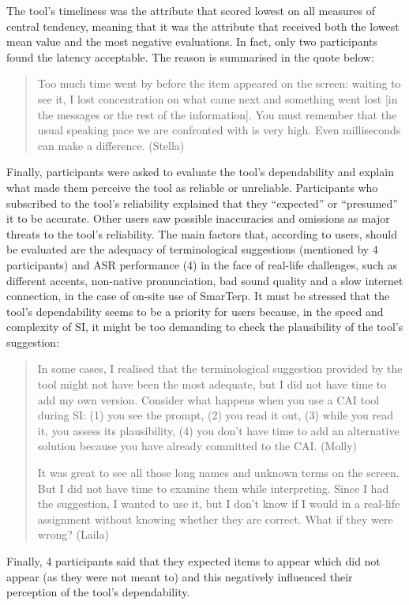 The tool’s timeliness was the attribute that scored lowest on all measures of central tendency, meaning that it was the attribute that received both the lowest mean value and the most negative evaluations. In fact, only two participants found the latency acceptable. The reason is summarised in the quote below:
\begin{quote}
    Too much time went by before the item appeared on the screen: waiting to see it, I lost concentration on what came next and something went lost [in the messages or the rest of the information]. You must remember that the usual speaking pace we are confronted with is very high. Even milliseconds can make a difference. (Stella)
\end{quote}
Finally, participants were asked to evaluate the tool’s dependability and explain what made them perceive the tool as reliable or unreliable. Participants who subscribed to the tool’s reliability explained that they ``expected'' or ``presumed'' it to be accurate. Other users saw possible inaccuracies and omissions as major threats to the tool’s reliability. The main factors that, according to users, should be evaluated are the adequacy of terminological suggestions (mentioned by 4 participants) and ASR performance (4) in the face of real-life challenges, such as different accents, non-native pronunciation, bad sound quality and a slow internet connection, in the case of on-site use of SmarTerp. It must be stressed that the tool’s dependability seems to be a priority for users because, in the speed and complexity of SI, it might be too demanding to check the plausibility of the tool’s suggestion:
\begin{quote}
    In some cases, I realised that the terminological suggestion provided by the tool might not have been the most adequate, but I did not have time to add my own version. Consider what happens when you use a CAI tool during SI: (1) you see the prompt, (2) you read it out, (3) while you read it, you assess its plausibility, (4) you don’t have time to add an alternative solution because you have already committed to the CAI. (Molly)


    It was great to see all those long names and unknown terms on the screen. But I did not have time to examine them while interpreting. Since I had the suggestion, I wanted to use it, but I don’t know if I would in a real-life assignment without knowing whether they are correct. What if they were wrong? (Laila)
\end{quote}
Finally, 4 participants said that they expected items to appear which did not appear (as they were not meant to) and this negatively influenced their perception of the tool’s dependability.

